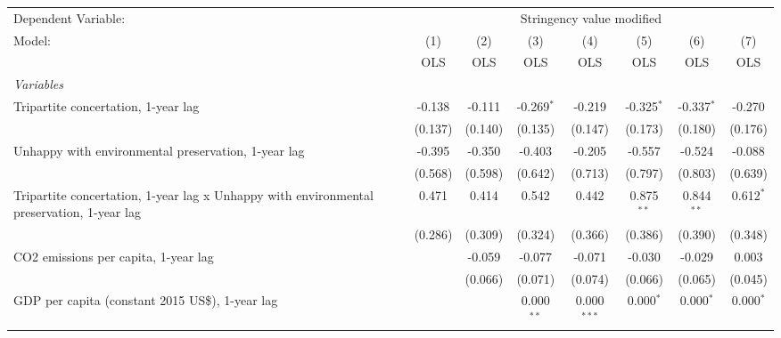 
\begingroup
\centering
\begin{tabular}{lccccccc}
   \toprule
   Dependent Variable: & \multicolumn{7}{c}{Stringency value modified}\\
   Model:                                                                                    & (1)     & (2)     & (3)          & (4)           & (5)           & (6)           & (7)\\  
                                                                                             &  OLS    & OLS     & OLS          & OLS           & OLS           & OLS           & OLS\\  
   \midrule
   \emph{Variables}\\
   Tripartite concertation, 1-year lag                                                       & -0.138  & -0.111  & -0.269$^{*}$ & -0.219        & -0.325$^{*}$  & -0.337$^{*}$  & -0.270\\   
                                                                                             & (0.137) & (0.140) & (0.135)      & (0.147)       & (0.173)       & (0.180)       & (0.176)\\   
   Unhappy with environmental preservation, 1-year lag                                       & -0.395  & -0.350  & -0.403       & -0.205        & -0.557        & -0.524        & -0.088\\   
                                                                                             & (0.568) & (0.598) & (0.642)      & (0.713)       & (0.797)       & (0.803)       & (0.639)\\   
   Tripartite concertation, 1-year lag x Unhappy with environmental preservation, 1-year lag & 0.471   & 0.414   & 0.542        & 0.442         & 0.875$^{**}$  & 0.844$^{**}$  & 0.612$^{*}$\\   
                                                                                             & (0.286) & (0.309) & (0.324)      & (0.366)       & (0.386)       & (0.390)       & (0.348)\\   
   CO2 emissions per capita, 1-year lag                                                      &         & -0.059  & -0.077       & -0.071        & -0.030        & -0.029        & 0.003\\   
                                                                                             &         & (0.066) & (0.071)      & (0.074)       & (0.066)       & (0.065)       & (0.045)\\   
   GDP per capita (constant 2015 US\$), 1-year lag                                           &         &         & 0.000$^{**}$ & 0.000$^{***}$ & 0.000$^{*}$   & 0.000$^{*}$   & 0.000$^{*}$\\   

\end{tabular}
